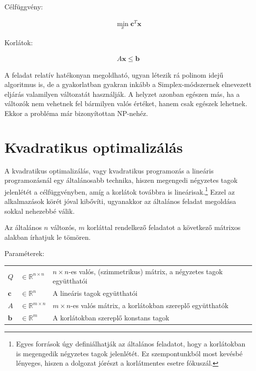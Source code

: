 Célfüggvény:

\begin{align}
	\min_{x} \mathbf{c}^T \mathbf{x} 
\end{align}

Korlátok:

\begin{align}
	A\mathbf{x} \leq \mathbf{b}
\end{align}

A feladat relatív hatékonyan megoldható, ugyan létezik rá polinom idejű algoritmus is, de a gyakorlatban gyakran inkább a Simplex-módszernek elnevezett eljárás valamilyen változatát használják.
A helyzet azonban egészen más, ha a változók nem vehetnek fel bármilyen valós értéket, hanem csak egészek lehetnek. Ekkor a probléma már bizonyítottan NP-nehéz.


\section{Kvadratikus optimalizálás}\label{sec:QuadOpt}

A kvadratikus optimalizálás, vagy kvadratikus programozás a lineáris programozásnál egy általánosabb technika, hiszen megengedi négyzetes tagok jelenlétét a célfüggvényben, amíg a korlátok továbbra is lineárisak.\footnote{Egyes források úgy definiálhatják az általános feladatot, hogy a korlátokban is megengedik négyzetes tagok jelenlétét. Ez szempontunkból most kevésbé lényeges, hiszen a dolgozat jórészt a korlátmentes esetre fókuszál.} Ezzel az alkalmazások körét jóval kibővíti, ugyanakkor az általános feladat megoldása sokkal nehezebbé válik. 

Az általános $n$ változós, $m$ korláttal rendelkező feladatot a következő mátrixos alakban írhatjuk le tömören.

Paraméterek:

\begin{tabular}{lll}
	$Q$ & $\in \mathbb{R}^{n×n}$  & $n × n$-es valós, (szimmetrikus) mátrix, a négyzetes tagok együtthatói \\
	$\mathbf{c}$ & $\in \mathbb{R}^n$   & A lineáris tagok együtthatói \\
	$A$ & $\in \mathbb{R}^{m×n}$  & $m × n$-es valós mátrix, a korlátokban szereplő együtthatók \\
	$\mathbf{b}$ & $\in \mathbb{R}^m$   & A korlátokban szereplő konstans tagok \\
\end{tabular}

